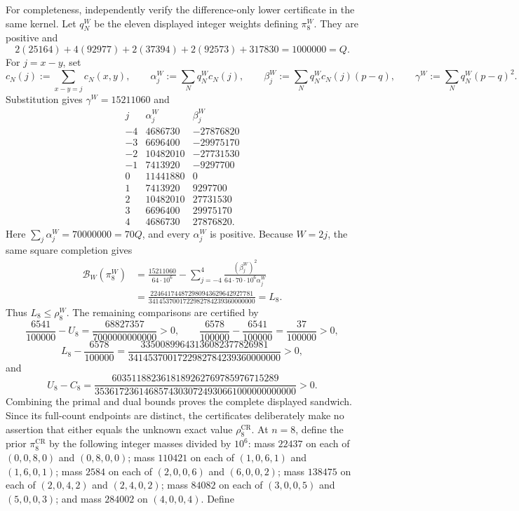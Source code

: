 For completeness, independently verify the difference-only lower certificate in the same kernel.  Let \(q_N^W\) be the eleven displayed integer weights defining \(\pi_8^W\).  They are positive and
\[
 2(25164)+4(92977)+2(37394)+2(92573)+317830=1000000=Q.
\]
For \(j=x-y\), set
\[
 c_N(j):=\sum_{x-y=j}c_N(x,y),\qquad
 \alpha_j^W:=\sum_Nq_N^Wc_N(j),\qquad
 \beta_j^W:=\sum_Nq_N^Wc_N(j)(p-q),\qquad
 \gamma^W:=\sum_Nq_N^W(p-q)^2.
\]
Substitution gives \(\gamma^W=15211060\) and
\[
\begin{array}{c|r|r}
j&\alpha_j^W&\beta_j^W\\ \hline
-4&4686730&-27876820\\
-3&6696400&-29975170\\
-2&10482010&-27731530\\
-1&7413920&-9297700\\
0&11441880&0\\
1&7413920&9297700\\
2&10482010&27731530\\
3&6696400&29975170\\
4&4686730&27876820.
\end{array}
\]
Here \(\sum_j\alpha_j^W=70000000=70Q\), and every \(\alpha_j^W\) is positive.  Because \(W=2j\), the same square completion gives
\[
\begin{aligned}
 \mathcal B_W(\pi_8^W)
 &=\frac{15211060}{64\cdot10^6}
 -\sum_{j=-4}^4\frac{(\beta_j^W)^2}{64\cdot70\cdot10^6\alpha_j^W}\\
 &=\frac{224641744872980943629642927781}
 {3414537001722982784239360000000}=L_8.
\end{aligned}
\]
Thus \(L_8\leq\rho_8^W\).  The remaining comparisons are certified by
\[
 \frac{6541}{100000}-U_8
 =\frac{68827357}{7000000000000}>0,
 \qquad
 \frac{6578}{100000}-\frac{6541}{100000}=\frac{37}{100000}>0,
\]
\[
 L_8-\frac{6578}{100000}
 =\frac{33500899643136082377826981}
 {3414537001722982784239360000000}>0,
\]
and
\[
 U_8-C_8
 =\frac{6035118823618189262769785976715289}
 {35361723614685743030724930661000000000000}>0.
\]
Combining the primal and dual bounds proves the complete displayed sandwich.  Since its full-count endpoints are distinct, the certificates deliberately make no assertion that either equals the unknown exact value \(\rho_8^{\mathrm{CR}}\).
At \(n=8\), define the prior \(\pi_8^{\mathrm{CR}}\) by the following integer masses divided by \(10^6\): mass \(22437\) on each of \((0,0,8,0)\) and \((0,8,0,0)\); mass \(110421\) on each of \((1,0,6,1)\) and \((1,6,0,1)\); mass \(2584\) on each of \((2,0,0,6)\) and \((6,0,0,2)\); mass \(138475\) on each of \((2,0,4,2)\) and \((2,4,0,2)\); mass \(84082\) on each of \((3,0,0,5)\) and \((5,0,0,3)\); and mass \(284002\) on \((4,0,0,4)\).  Define
